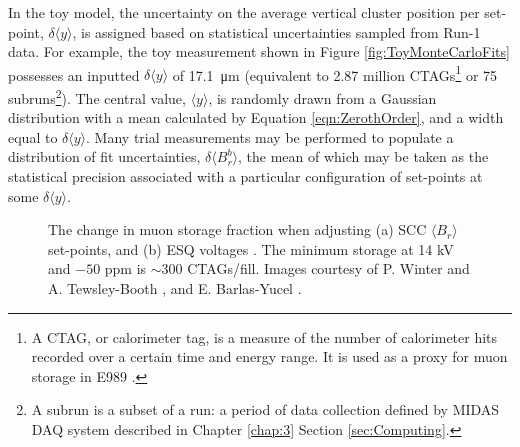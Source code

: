 In the toy model, the uncertainty on the average vertical cluster position per set-point, $\delta \langle y \rangle$, is assigned based on statistical uncertainties sampled from Run-1 data. For example, the toy measurement shown in Figure \ref{fig:ToyMonteCarloFits} possesses an inputted $\delta \langle y \rangle$ of \SI{17.1}{\micro\metre} (equivalent to 2.87 million CTAGs\footnote{A CTAG, or calorimeter tag, is a measure of the number of calorimeter hits recorded over a certain time and energy range. It is used as a proxy for muon storage in E989 \cite{CTAG}.} or 75 subruns\footnote{A subrun is a subset of a run: a period of data collection defined by MIDAS DAQ system described in Chapter \ref{chap:3} Section \ref{sec:Computing}.}). The central value, $\langle y \rangle$, is randomly drawn from a Gaussian distribution with a mean calculated by Equation \ref{eqn:ZerothOrder}, and a width equal to $\delta\langle y \rangle$. Many trial measurements may be performed to populate a distribution of fit uncertainties, $\delta \langle B_{r}^{b} \rangle$, the mean of which may be taken as the statistical precision associated with a particular configuration of set-points at some $\delta\langle y \rangle$. 

\begin{figure}[t!]
\centering{}
 \hfill
{}
\caption{The change in muon storage fraction when adjusting (a) SCC $\langle B_{r} \rangle$ set-points, and (b) ESQ voltages  . The minimum storage at 14 kV and $-50$ ppm is $\sim$300 CTAGs/fill. Images courtesy of P. Winter and A. Tewsley-Booth \cite{RadialFieldScanElog}, and E. Barlas-Yucel \cite{ESQStorage}.}
\label{fig:Storage}
\end{figure}

